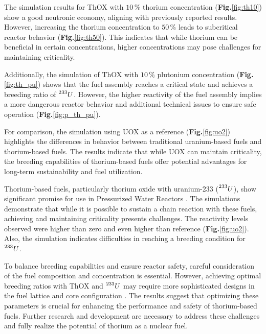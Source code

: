 The simulation results for ThOX with \(10 \, \%\) thorium concentration (\textbf{Fig.}\ref{fig:th10}) show a good neutronic economy, aligning with previously reported results. However, increasing the thorium concentration to \(50 \, \%\) leads to subcritical reactor behavior (\textbf{Fig.}\ref{fig:th50}). This indicates that while thorium can be beneficial in certain concentrations, higher concentrations may pose challenges for maintaining criticality.

Additionally, the simulation of ThOX with \(10 \, \%\) plutonium concentration (\textbf{Fig.}\ref{fig:th_pu}) shows that the fuel assembly reaches a critical state and achieves a breeding ratio of \(\prescript{233}{}{U}\). However, the higher reactivity of the fuel assembly implies a more dangerous reactor behavior and additional technical issues to ensure safe operation (\textbf{Fig.}\ref{fig:p_th_pu}).

For comparison, the simulation using UOX as a reference (\textbf{Fig.}\ref{fig:uo2}) highlights the differences in behavior between traditional uranium-based fuels and thorium-based fuels. The results indicate that while UOX can maintain criticality, the breeding capabilities of thorium-based fuels offer potential advantages for long-term sustainability and fuel utilization.

Thorium-based fuels, particularly thorium oxide with uranium-233 (\(\prescript{233}{}{U}\)), show significant promise for use in Pressurized Water Reactors . The simulations demonstrate that while it is possible to sustain a chain reaction with these fuels, achieving and maintaining criticality presents challenges. The reactivity levels observed were higher than zero and even higher than reference (\textbf{Fig.}\ref{fig:uo2}). Also, the simulation indicates difficulties in reaching a breeding condition for \(\prescript{233}{}{U}\).

\vspace{90pt}

To balance breeding capabilities and ensure reactor safety, careful consideration of the fuel composition and concentration is essential. However, achieving optimal breeding ratios with ThOX and \(\prescript{233}{}{U}\) may require more sophisticated designs in the fuel lattice and core configuration \cite{roadmap}. The results suggest that optimizing these parameters is crucial for enhancing the performance and safety of thorium-based fuels. Further research and development are necessary to address these challenges and fully realize the potential of thorium as a nuclear fuel.
